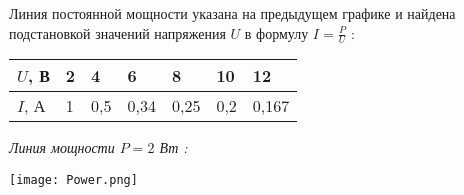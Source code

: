 \documentclass[a4paper,11pt]{article}
\begin{document}
\begin{flushleft}
\begin{list}{}{\leftmargin=3cm}
	\end{list}
	Линия постоянной мощности указана на предыдущем графике и найдена подстановкой значений напряжения ${U}$  в формулу ${I=\frac{P}{U}}$ :
	\begin{center}
		\begin{tabular}{|p{1cm}|p{1cm}|p{1cm}|p{1cm}|p{1cm}|p{1cm}|p{1cm}|}
			\hline ${U}$, В & 2 & 4 & 6 & 8 & 10 & 12 \\ 
			\hline ${I}$, А & 1 & 0,5 & 0,34 & 0,25 & 0,2 &  0,167 \\ 
			\hline 
		\end{tabular} 
	\end{center}
	\newpage
	\textit{Линия мощности ${P = 2}$ Вт :}
	\begin{center}
		\texttt{[image: Power.png]}
	\end{center}		 
	\end{flushleft}
\end{document}

